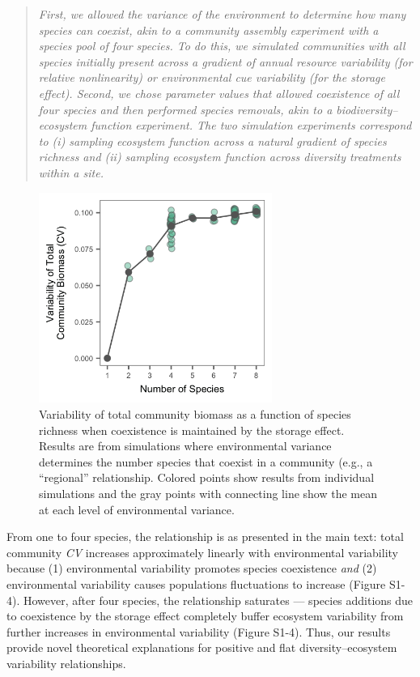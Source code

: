 \documentclass[11pt,]{article}
\begin{document}
\begin{quote}
\emph{First, we allowed the variance of the environment to determine how many species can coexist, akin to a community assembly experiment with a species pool of four species.
To do this, we simulated communities with all species initially present across a gradient of annual resource variability (for relative nonlinearity) or environmental cue variability (for the storage effect).
Second, we chose parameter values that allowed coexistence of all four species and then performed species removals, akin to a biodiversity--ecosystem function experiment.
The two simulation experiments correspond to (i) sampling ecosystem function across a natural gradient of species richness and (ii) sampling ecosystem function across diversity treatments within a site.}
\end{quote}

\begin{figure}[!ht]
  \centering
      \includegraphics[width=3in]{./components/regional_diversity_stability_storage_effect_8species.png}
  \caption{Variability of total community biomass as a function of species richness when coexistence is maintained by the storage effect. Results are from simulations where environmental variance determines the number species that coexist in a community (e.g., a ``regional'' relationship. Colored points show results from individual simulations and the gray points with connecting line show the mean at each level of environmental variance.}
\end{figure}

From one to four species, the relationship is as presented in the main
text: total community \emph{CV} increases approximately linearly with
environmental variability because (1) environmental variability promotes
species coexistence \emph{and} (2) environmental variability causes
populations fluctuations to increase (Figure S1-4). However, after four
species, the relationship saturates --- species additions due to
coexistence by the storage effect completely buffer ecosystem
variability from further increases in environmental variability (Figure
S1-4). Thus, our results provide novel theoretical explanations for
positive and flat diversity--ecosystem variability relationships.
\end{document}
